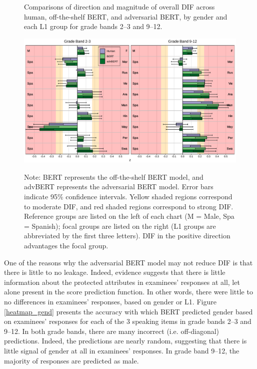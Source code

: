 \documentclass [PhD] {uclathes}
\begin{document}
\begin{figure}[!htb]
    \centering
    \caption{Comparisons of direction and magnitude of overall DIF across human, off-the-shelf BERT, and adversarial BERT, by gender and each L1 group for grade bands 2–3 and 9–12.}    
    \includegraphics[width=6.5in]{figures/20230517_ETS-DIF_advBERT_z_ovr_edit.pdf}
    \label{advBERT_z_ovr}
\caption*{\small Note: BERT represents the off-the-shelf BERT model, and advBERT represents the adversarial BERT model. Error bars indicate 95\% confidence intervals. Yellow shaded regions correspond to moderate DIF, and red shaded regions correspond to strong DIF. Reference groups are listed on the left of each chart (M = Male, Spa = Spanish); focal groups are listed on the right (L1 groups are abbreviated by the first three letters). DIF in the positive direction advantages the focal group.}
\end{figure}

One of the reasons why the adversarial BERT model may not reduce DIF is that there is little to no leakage. Indeed, evidence suggests that there is little information about the protected attributes in examinees’ responses at all, let alone present in the score prediction function. In other words, there were little to no differences in examinees’ responses, based on gender or L1. Figure \ref{heatmap_gend} presents the accuracy with which BERT predicted gender based on examinees’ responses for each of the 3 speaking items in grade bands 2–3 and 9–12. In both grade bands, there are many incorrect (i.e. off-diagonal) predictions. Indeed, the predictions are nearly random, suggesting that there is little signal of gender at all in examinees’ responses. In grade band 9–12, the majority of responses are predicted as male. 
\end{document}
